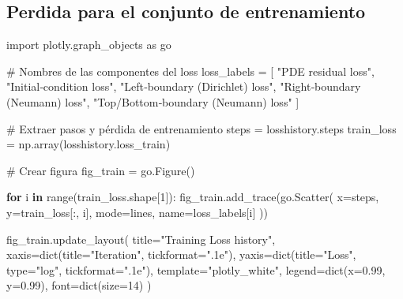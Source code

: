 \documentclass[
  spanish,
  us-letterpaper,
  DIV=11,
  numbers=noendperiod]{scrreprt}
\newenvironment{Shaded}{\begin{snugshade}}{\end{snugshade}}
\newcommand{\BuiltInTok}[1]{\textcolor[rgb]{0.00,0.23,0.31}{#1}}
\newcommand{\CommentTok}[1]{\textcolor[rgb]{0.37,0.37,0.37}{#1}}
\newcommand{\ControlFlowTok}[1]{\textcolor[rgb]{0.00,0.23,0.31}{\textbf{#1}}}
\newcommand{\DecValTok}[1]{\textcolor[rgb]{0.68,0.00,0.00}{#1}}
\newcommand{\FloatTok}[1]{\textcolor[rgb]{0.68,0.00,0.00}{#1}}
\newcommand{\ImportTok}[1]{\textcolor[rgb]{0.00,0.46,0.62}{#1}}
\newcommand{\KeywordTok}[1]{\textcolor[rgb]{0.00,0.23,0.31}{\textbf{#1}}}
\newcommand{\NormalTok}[1]{\textcolor[rgb]{0.00,0.23,0.31}{#1}}
\newcommand{\OperatorTok}[1]{\textcolor[rgb]{0.37,0.37,0.37}{#1}}
\newcommand{\StringTok}[1]{\textcolor[rgb]{0.13,0.47,0.30}{#1}}
\theoremstyle{definition}
\theoremstyle{plain}
\theoremstyle{remark}
\begin{document}
\subsection{Perdida para el conjunto de
entrenamiento}\label{perdida-para-el-conjunto-de-entrenamiento}

\begin{Shaded}
\begin{Highlighting}[]
\ImportTok{import}\NormalTok{ plotly.graph\_objects }\ImportTok{as}\NormalTok{ go}

\CommentTok{\# Nombres de las componentes del loss}
\NormalTok{loss\_labels }\OperatorTok{=}\NormalTok{ [}
    \StringTok{"PDE residual loss"}\NormalTok{,}
    \StringTok{"Initial‐condition loss"}\NormalTok{,}
    \StringTok{"Left‐boundary (Dirichlet) loss"}\NormalTok{,}
    \StringTok{"Right‐boundary (Neumann) loss"}\NormalTok{,}
    \StringTok{"Top/Bottom‐boundary (Neumann) loss"}
\NormalTok{]}

\CommentTok{\# Extraer pasos y pérdida de entrenamiento}
\NormalTok{steps }\OperatorTok{=}\NormalTok{ losshistory.steps}
\NormalTok{train\_loss }\OperatorTok{=}\NormalTok{ np.array(losshistory.loss\_train)}

\CommentTok{\# Crear figura}
\NormalTok{fig\_train }\OperatorTok{=}\NormalTok{ go.Figure()}

\ControlFlowTok{for}\NormalTok{ i }\KeywordTok{in} \BuiltInTok{range}\NormalTok{(train\_loss.shape[}\DecValTok{1}\NormalTok{]):}
\NormalTok{    fig\_train.add\_trace(go.Scatter(}
\NormalTok{        x}\OperatorTok{=}\NormalTok{steps,}
\NormalTok{        y}\OperatorTok{=}\NormalTok{train\_loss[:, i],}
\NormalTok{        mode}\OperatorTok{=}\StringTok{\textquotesingle{}lines\textquotesingle{}}\NormalTok{,}
\NormalTok{        name}\OperatorTok{=}\NormalTok{loss\_labels[i]}
\NormalTok{    ))}

\NormalTok{fig\_train.update\_layout(}
\NormalTok{    title}\OperatorTok{=}\StringTok{"Training Loss history"}\NormalTok{,}
\NormalTok{    xaxis}\OperatorTok{=}\BuiltInTok{dict}\NormalTok{(title}\OperatorTok{=}\StringTok{"Iteration"}\NormalTok{, tickformat}\OperatorTok{=}\StringTok{".1e"}\NormalTok{),}
\NormalTok{    yaxis}\OperatorTok{=}\BuiltInTok{dict}\NormalTok{(title}\OperatorTok{=}\StringTok{"Loss"}\NormalTok{, }\BuiltInTok{type}\OperatorTok{=}\StringTok{"log"}\NormalTok{, tickformat}\OperatorTok{=}\StringTok{".1e"}\NormalTok{),}
\NormalTok{    template}\OperatorTok{=}\StringTok{"plotly\_white"}\NormalTok{,}
\NormalTok{    legend}\OperatorTok{=}\BuiltInTok{dict}\NormalTok{(x}\OperatorTok{=}\FloatTok{0.99}\NormalTok{, y}\OperatorTok{=}\FloatTok{0.99}\NormalTok{),}
\NormalTok{    font}\OperatorTok{=}\BuiltInTok{dict}\NormalTok{(size}\OperatorTok{=}\DecValTok{14}\NormalTok{)}
\NormalTok{)}
\end{Highlighting}
\end{Shaded}
\end{document}
